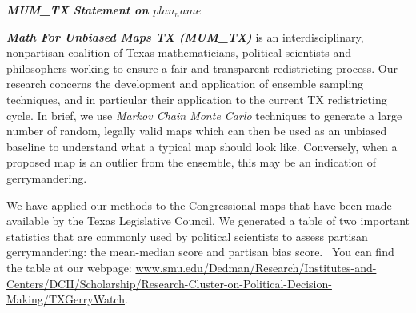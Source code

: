 \documentclass[letterpaper]{article}
\title{}
\author{Barreiro, Andrea}
\newcommand\textstyleInternetlink[1]{\textcolor[rgb]{0.019607844,0.3882353,0.75686276}{#1}}
\newcommand{\VAR}[1] {$#1$}
\begin{document}
\textbf{\textit{MUM\_TX Statement on \VAR{plan_name}}}

\bigskip

\textbf{\textit{Math For Unbiased Maps TX (MUM\_TX) }}is\textbf{\textit{ }}an interdisciplinary, nonpartisan coalition
of Texas mathematicians, political scientists and philosophers working to ensure a fair and transparent redistricting
process. Our research concerns the development and application of ensemble sampling techniques, and in particular their
application to the current TX redistricting cycle. In brief, we use \textit{Markov Chain Monte Carlo }techniques to
generate a large number of random, legally valid maps which can then be used as an unbiased baseline to understand what
a typical map should look like. Conversely, when a proposed map is an outlier from the ensemble, this may be an
indication of gerrymandering.

\bigskip

We have applied our methods to the Congressional maps that have been made available by the Texas Legislative Council. 
We generated a table of two important statistics that are commonly used by political scientists to assess
partisan gerrymandering: the mean-median score and partisan bias score. \ You can find the table at our webpage:
\href{http://www.smu.edu/Dedman/Research/Institutes-and-Centers/DCII/Scholarship/Research-Cluster-on-Political-Decision-Making/TXGerryWatch}{\textstyleInternetlink{www.smu.edu/Dedman/Research/Institutes-and-Centers/DCII/Scholarship/Research-Cluster-on-Political-Decision-Making/TXGerryWatch}}.

\end{document}
